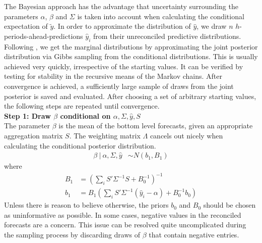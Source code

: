 \documentclass[a4paper,fleqn,11pt]{article}
\begin{document}
The Bayesian approach has the advantage that uncertainty surrounding the parameters $\alpha$, $\beta$ and $\Sigma$ is taken into account when calculating the conditional expectation of $\tilde{y}$. In order to approximate the distribution of $\hat{y}$, we draw $n$ $h$-periods-ahead-predictions $\hat{y}_i$ from their unreconciled predictive distributions. Following \cite{Percy1992}, we get the marginal distributions by approximating the joint posterior distribution via Gibbs sampling from the conditional distributions.  This is usually achieved very quickly, irrespective of the starting values. It can be verified by testing for stability in the recursive means of the Markov chains. After convergence is achieved, a sufficiently large sample of draws from the joint posterior is saved and evaluated. After choosing a set of arbitrary starting values, the following steps are repeated until convergence.\\


\noindent\textbf{Step 1: Draw $\beta$ conditional on $\alpha,\Sigma,\hat{y},S$}\\
The parameter $\beta$ is the mean of the bottom level forecasts, given an appropriate aggregation matrix $S$. The weighting matrix $\Lambda$ cancels out nicely when calculating the conditional posterior distribution.
\begin{align}
\beta\ |\ \alpha,\Sigma,\hat{y} &\sim N(b_1,B_1)
\end{align}
where
\begin{align*}
B_1 &= \left(\sum_i S'\Sigma^{-1}S + B_0^{-1}\right)^{-1} \\
b_1 &= B_1 \left(\sum_i S'\Sigma^{-1} (\hat{y}_i - \alpha) + B_0^{-1}b_0\right)
\end{align*}
Unless there is reason to believe otherwise, the priors $b_0$ and $B_0$ should be chosen as uninformative as possible. In some cases, negative values in the reconciled forecasts are a concern. This issue can be resolved quite uncomplicated during the sampling process by discarding draws of $\beta$ that contain negative entries.\\
\end{document}
